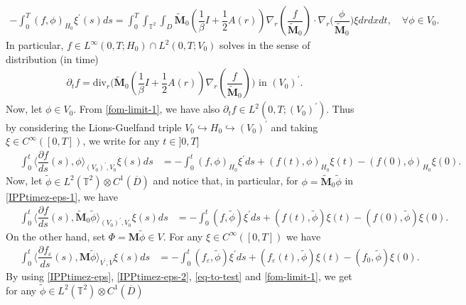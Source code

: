 \documentclass[a4paper,12pt, reqno]{amsart}
\newcommand{\T}{\mathbb{T}}
\newcommand{\Div}{\text{div}}
\begin{document}
   \begin{align*}
       - \int_0^T (f,\phi)_{H_0}  \xi^\prime(s) ds=\int_0^T\int_{\mathbb{T}^2}\int_D\widetilde{\mathbf{M}}_0 (\dfrac{1}{\beta}I+\dfrac{1}{2}A(r))\nabla_r(\dfrac{f}{\widetilde{\mathbf{M}}_0})\cdot \nabla_r\big( \dfrac{\phi}{\widetilde{\mathbf{M}}_0}\big) \xi drdx dt,\quad \forall \phi \in V_0.
   \end{align*}
In particular, $f \in L^\infty(0, T;H_0)\cap   L^2(0, T;V_0)$  solves in the sense of distribution (in time) 
  \begin{align}\label{fom-limit-1}
       \partial_t f= \Div_r\bigl(\widetilde{\mathbf{M}}_0 (\dfrac{1}{\beta}I+\dfrac{1}{2}A(r))\nabla_r(\dfrac{f}{\widetilde{\mathbf{M}}_0})\bigr) \text{ in } (V_0)^\prime.
    \end{align}
 Now, let $\phi \in V_0$. From \eqref{fom-limit-1}, we have also $\partial_tf\in L^2(0, T;(V_0)^\prime).$ Thus by considering the Lions-Guelfand triple $V_0\hookrightarrow H_0\hookrightarrow (V_0)^\prime$ and taking $\xi\in C^\infty([0,T])$, we write
   for any $t\in ]0,T]$
      \begin{align}\label{IPPtimez-eps-1}
	 \quad	\int_0^t	\langle\dfrac{\partial f}{ds}(s),\phi\rangle_{(V_0)^\prime,V_0}\xi(s) ds&=-\int_0^t(f,\phi)_{H_0}\xi^\prime ds+(  f(t) ,\phi)_{H_0}\xi(t)- (  f(0) ,\phi)_{H_0}\xi(0).
	\end{align}
    Now, let  $\widetilde{\phi}\in L^2(\T^2)\otimes C^1(\overline{D})$ and notice that, in particular, for $\phi=\widetilde{\mathbf{M}}_0\widetilde{\phi}$ in  \eqref{IPPtimez-eps-1}, we have 
         \begin{align}\label{IPPtimez-eps}
	 \quad	\int_0^t	\langle\dfrac{\partial f}{ds}(s),\widetilde{\mathbf{M}}_0\widetilde{\phi}\rangle_{(V_0)^\prime,V_0}\xi(s) ds&=-\int_0^t(f,\widetilde{\phi})\xi^\prime ds+(  f(t) ,\widetilde{\phi})\xi(t)- (  f(0) ,\widetilde{\phi})\xi(0).
	\end{align}
    On the other hand,       set $\Phi=\mathbf{M}\widetilde{\phi}  \in V.$
For any 
      $\xi\in C^\infty([0,T])$ we have
        \begin{align}\label{IPPtimez-eps-2}
	 \quad	\int_0^t	\langle\dfrac{\partial f_\varepsilon}{ds}(s),\mathbf{M}\widetilde{\phi}\rangle_{V^\prime,V}\xi(s) ds&=-\int_0^t(f_\varepsilon,\widetilde{\phi})\xi^\prime ds+(  f_\varepsilon(t) ,\widetilde{\phi})\xi(t)- (  f_0,\widetilde{\phi})\xi(0).
	\end{align}
    By using \eqref{IPPtimez-eps}, \eqref{IPPtimez-eps-2}, \eqref{eq-to-test}  and \eqref{fom-limit-1}, we get for any $\widetilde{\phi}\in L^2(\T^2)\otimes C^1(\overline{D})$
\end{document}
